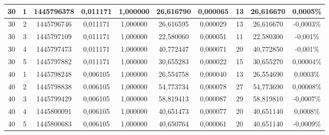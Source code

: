 \begin{landscape}
\begin{center}
\begin{table}[htbp]
\begin{tabular}{cccccccccc}
\hline
        30 &          1 & 1445796378 &   0,011171 &   1,000000 &  26,616790 &   0,000065 &         13 &  26,616670 &   0,0005\% \\
\hline
        30 &          2 & 1445796746 &   0,011171 &   1,000000 &  26,616595 &   0,000029 &         13 &  26,616670 &  -0,0003\% \\
\hline
        30 &          3 & 1445797109 &   0,011171 &   1,000000 &  22,580060 &   0,000051 &         11 &  22,580300 &   -0,001\% \\
\hline
        30 &          4 & 1445797473 &   0,011171 &   1,000000 &  40,772447 &   0,000071 &         20 &  40,772850 &   -0,001\% \\
\hline
        30 &          5 & 1445797882 &   0,011171 &   1,000000 &  30,655283 &   0,000022 &         15 &  30,655270 &  0,00004\% \\
\hline
        40 &          1 & 1445798248 &   0,006105 &   1,000000 &  26,554758 &   0,000040 &         13 &  26,554690 &   0,0003\% \\
\hline
        40 &          2 & 1445798838 &   0,006105 &   1,000000 &  54,773734 &   0,000078 &         27 &  54,773690 &  0,00008\% \\
\hline
        40 &          3 & 1445799429 &   0,006105 &   1,000000 &  58,819413 &   0,000087 &         29 &  58,819810 &  -0,0007\% \\
\hline
        40 &          4 & 1445800091 &   0,006105 &   1,000000 &  40,651473 &   0,000077 &         20 &  40,651140 &   0,0008\% \\
\hline
        40 &          5 & 1445800683 &   0,006105 &   1,000000 &  40,650764 &   0,000061 &         20 &  40,651140 &  -0,0009\% \\
\hline \hline
\end{tabular}
\end{table}  
\end{center}
\end{landscape}

